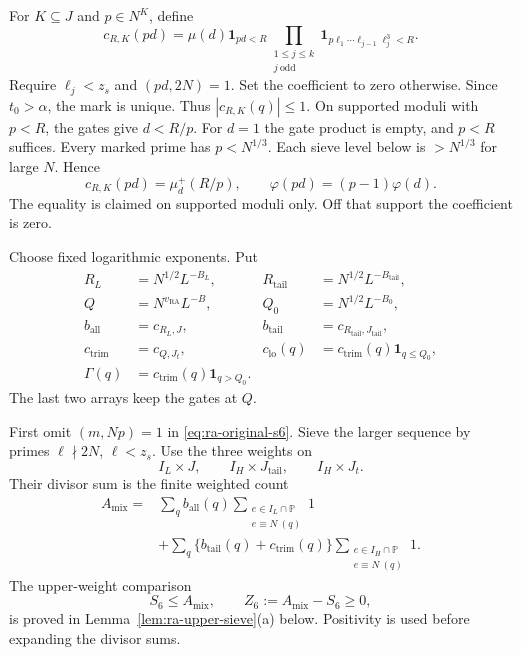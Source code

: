 For \(K\subseteq J\) and \(p\in N^K\), define
\begin{equation}\label{eq:ra-coefficient}
 c_{R,K}(pd)=\mu(d)\mathbf1_{pd<R}
 \prod_{\substack{1\le j\le k\\j\ \mathrm{odd}}}
 \mathbf1_{p\ell_1\cdots\ell_{j-1}\ell_j^3<R}.
\end{equation}
Require \(\ell_j<z_s\) and \((pd,2N)=1\).
Set the coefficient to zero otherwise.
Since \(t_0>\alpha\), the mark is unique.
Thus \(|c_{R,K}(q)|\le1\).
On supported moduli with \(p<R\), the gates give \(d<R/p\).
For \(d=1\) the gate product is empty, and \(p<R\) suffices.
Every marked prime has \(p<N^{1/3}\).
Each sieve level below is \(>N^{1/3}\) for large \(N\).
Hence
\begin{equation}\label{eq:ra-weight-equality}
 c_{R,K}(pd)=\mu_d^+(R/p),\qquad
 \varphi(pd)=(p-1)\varphi(d).
\end{equation}
The equality is claimed on supported moduli only.
Off that support the coefficient is zero.

Choose fixed logarithmic exponents. Put
\begin{equation}\label{eq:ra-factories}
\begin{aligned}
 R_L&=N^{1/2}L^{-B_L},&
 R_{\mathrm{tail}}&=N^{1/2}L^{-B_{\mathrm{tail}}},\\
 Q&=N^{v_{\mathrm{RA}}}L^{-B},&Q_0&=N^{1/2}L^{-B_0},\\
 b_{\mathrm{all}}&=c_{R_L,J},&
 b_{\mathrm{tail}}&=c_{R_{\mathrm{tail}},J_{\mathrm{tail}}},\\
 c_{\mathrm{trim}}&=c_{Q,J_t},&
 c_{\mathrm{lo}}(q)&=c_{\mathrm{trim}}(q)\mathbf1_{q\le Q_0},\\
 \Gamma(q)&=c_{\mathrm{trim}}(q)\mathbf1_{q>Q_0}.
\end{aligned}
\end{equation}
The last two arrays keep the gates at \(Q\).

First omit \((m,Np)=1\) in \eqref{eq:ra-original-s6}.
Sieve the larger sequence by primes \(\ell\nmid2N\), \(\ell<z_s\).
Use the three weights on
\begin{equation}\label{eq:ra-three-pieces}
 I_L\times J,\qquad I_H\times J_{\mathrm{tail}},\qquad I_H\times J_t.
\end{equation}
Their divisor sum is the finite weighted count
\begin{equation}\label{eq:ra-mix-definition}
\begin{aligned}
 A_{\mathrm{mix}}={}&
 \sum_q b_{\mathrm{all}}(q)
       \sum_{\substack{e\in I_L\cap\mathbb P\\e\equiv N\ (q)}}1\\
 &+\sum_q\{b_{\mathrm{tail}}(q)+c_{\mathrm{trim}}(q)\}
       \sum_{\substack{e\in I_H\cap\mathbb P\\e\equiv N\ (q)}}1.
\end{aligned}
\end{equation}
The upper-weight comparison
\begin{equation}\label{eq:ra-positive-comparison}
 S_6\le A_{\mathrm{mix}},\qquad
 Z_6:=A_{\mathrm{mix}}-S_6\ge0,
\end{equation}
is proved in Lemma~\ref{lem:ra-upper-sieve}(a) below.
Positivity is used before expanding the divisor sums.

